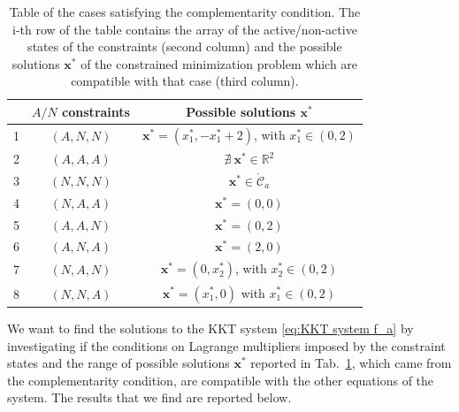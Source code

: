 \documentclass[a4paper,11pt]{article}
\begin{document}
\begin{table}[H]
	\centering
	\begin{tabular}{|c|c|c|}
		\hline
		& $A/N$ constraints & Possible solutions $\textbf{x}^*$ \\
		\hline
		1 & $(A, N, N)$ & $\textbf{x}^* = (x_{1}^*,-x_{1}^*+2)$, with $x_{1}^*\in (0,2)$\\
		2 & $(A, A, A)$ & $\nexists \ \textbf{x}^* \in \mathbb{R}^{2}$\\
		3 & $(N, N, N)$ & $\textbf{x}^* \in \mathring{\mathcal{C}}_{a}$\\
		4 & $(N, A, A)$ & $\textbf{x}^* = (0,0)$\\
		5 & $(A, A, N)$ & $\textbf{x}^* = (0,2)$\\
		6 & $(A, N, A)$ & $\textbf{x}^* = (2,0)$\\
		7 & $(N, A, N)$ & $\textbf{x}^* = (0,x_{2}^*)$, with $x_{2}^* \in (0,2)$\\
		8 & $(N, N, A)$ & $\textbf{x}^* = (x_{1}^*,0)$ with $x_{1}^* \in (0,2)$\\
		\hline
	\end{tabular}
	\caption{Table of the cases satisfying the complementarity condition. The i-th row of the table contains the array of the active/non-active states of the constraints (second column) and the possible solutions $\textbf{x}^*$ of the constrained minimization problem which are compatible with that case (third column).}
	\label{tab:complementarity conditions f_a}
\end{table}
\noindent We want to find the solutions to the KKT system \eqref{eq:KKT system f_a} by investigating if the conditions on Lagrange multipliers imposed by the constraint states and the range of possible solutions $\textbf{x}^*$ reported in Tab.~\ref*{tab:complementarity conditions f_a}, which came from the complementarity condition, are compatible with the other equations of the system.
The results that we find are reported below.
\end{document}
